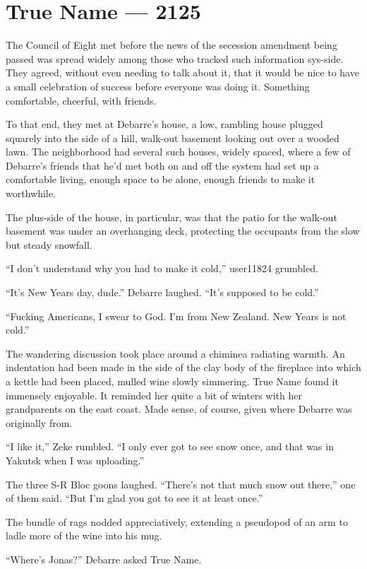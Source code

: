 \hypertarget{true-name-2125}{%
\chapter{True Name — 2125}\label{true-name-2125}}

The Council of Eight met before the news of the secession amendment being passed was spread widely among those who tracked such information sys-side. They agreed, without even needing to talk about it, that it would be nice to have a small celebration of success before everyone was doing it. Something comfortable, cheerful, with friends.

To that end, they met at Debarre's house, a low, rambling house plugged squarely into the side of a hill, walk-out basement looking out over a wooded lawn. The neighborhood had several such houses, widely spaced, where a few of Debarre's friends that he'd met both on and off the system had set up a comfortable living, enough space to be alone, enough friends to make it worthwhile.

The plus-side of the house, in particular, was that the patio for the walk-out basement was under an overhanging deck, protecting the occupants from the slow but steady snowfall.

``I don't understand why you had to make it cold,'' user11824 grumbled.

``It's New Years day, dude.'' Debarre laughed. ``It's supposed to be cold.''

``Fucking Americans, I swear to God. I'm from New Zealand. New Years is not cold.''

The wandering discussion took place around a chiminea radiating warmth. An indentation had been made in the side of the clay body of the fireplace into which a kettle had been placed, mulled wine slowly simmering. True Name found it immensely enjoyable. It reminded her quite a bit of winters with her grandparents on the east coast. Made sense, of course, given where Debarre was originally from.

``I like it,'' Zeke rumbled. ``I only ever got to see snow once, and that was in Yakutsk when I was uploading.''

The three S-R Bloc goons laughed. ``There's not that much snow out there,'' one of them said. ``But I'm glad you got to see it at least once.''

The bundle of rags nodded appreciatively, extending a pseudopod of an arm to ladle more of the wine into his mug.

``Where's Jonas?'' Debarre asked True Name.

